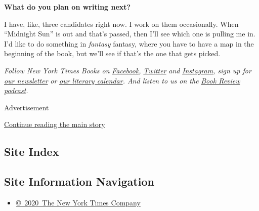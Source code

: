 \textbf{What do you plan on writing next?}

I have, like, three candidates right now. I work on them occasionally.
When ``Midnight Sun'' is out and that's passed, then I'll see which one
is pulling me in. I'd like to do something in \emph{fantasy} fantasy,
where you have to have a map in the beginning of the book, but we'll see
if that's the one that gets picked.

\emph{Follow New York Times Books on}
\href{https://www.facebookcorewwwi.onion/nytbooks/}{\emph{Facebook}}\emph{,}
\href{https://twitter.com/nytimesbooks}{\emph{Twitter}} \emph{and}
\href{https://www.instagram.com/nytbooks/}{\emph{Instagram}}\emph{, sign
up for}
\href{https://www.nytimes3xbfgragh.onion/newsletters/books-review}{\emph{our
newsletter}} \emph{or}
\href{https://www.nytimes3xbfgragh.onion/interactive/2017/books/books-calendar.html}{\emph{our
literary calendar}}\emph{. And listen to us on the}
\href{https://www.nytimes3xbfgragh.onion/column/book-review-podcast}{\emph{Book
Review podcast}}\emph{.}

Advertisement

\protect\hyperlink{after-bottom}{Continue reading the main story}

\hypertarget{site-index}{%
\subsection{Site Index}\label{site-index}}

\hypertarget{site-information-navigation}{%
\subsection{Site Information
Navigation}\label{site-information-navigation}}

\begin{itemize}
\tightlist
\item
  \href{https://help.nytimes3xbfgragh.onion/hc/en-us/articles/115014792127-Copyright-notice}{©~2020~The
  New York Times Company}
\end{itemize}

